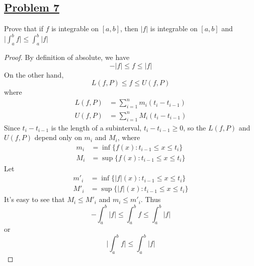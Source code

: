 \documentclass[10pt,letterpaper]{article}
\begin{document}
	\subsection*{{\color{purple}\underline{Problem 7}}}
	Prove that if $f$ is integrable on $[a, b]$, then $|f|$ is integrable on $[a, b]$ and 
	$\displaystyle\bigg|\int_{a}^{b} f \bigg| \leq \displaystyle\int_{a}^{b} |f|$
	\begin{proof}
	By definition of absolute, we have
	$$
		-|f| \leq f \leq |f|
	$$
	On the other hand, 
	$$L(f, P) \leq f \leq U(f, P)$$
	where
	\begin{align*}
		L(f, P) &= \displaystyle\sum_{i=1}^{n} m_i(t_{i} - t_{i-1}) \\
		U(f, P) &= \displaystyle\sum_{i=1}^{n} M_i(t_{i} - t_{i-1}) 
	\end{align*}
	Since $t_i - t_{i-1}$ is the length of a subinterval, $t_i - t_{i-1} \geq 0$, so the $L(f, P)$ and $U(f, P)$ depend
	only on $m_i$ and $M_i$, where
	\begin{align*}
		m_i &= \inf\{f(x): t_{i-1} \leq x \leq t_{i} \} \\
		M_i &= \sup\{f(x): t_{i-1} \leq x \leq t_{i} \} 	
	\end{align*}
	Let 
	\begin{align*}
		m'_i &= \inf\{|f|(x): t_{i-1} \leq x \leq t_{i} \} \\
		M'_i &= \sup\{|f|(x): t_{i-1} \leq x \leq t_{i} \} 	
	\end{align*}
	It's easy to see that
	$M_i \leq M'_i$
	and $m_i \leq m'_i$. Thus
	$$-\displaystyle\int_{a}^{b} |f| \leq \displaystyle\int_{a}^{b} f \leq \displaystyle\int_{a}^{b} |f|$$
	or 
	$$\displaystyle\bigg|\int_{a}^{b} f \bigg| \leq \displaystyle\int_{a}^{b} |f|$$
	\end{proof}
	
\end{document}
